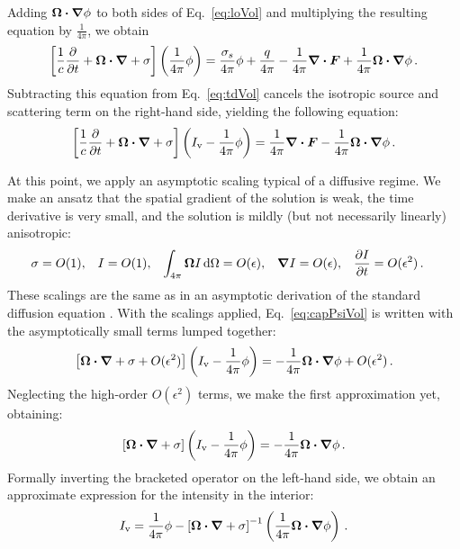 Adding $\bm{\Omega}\bm{\cdot} \bm{\nabla} \phi$ to both sides of Eq.~\eqref{eq:loVol} and
multiplying the resulting equation by $\frac{1}{4\pi}$, we obtain
\begin{align*}
  \left[ \frac{1}{c}\frac{\partial }{\partial t}
  + \bm{\Omega}\bm{\cdot} \bm{\nabla}
  + \sigma \right]
  \left( \frac{1}{4\pi} \phi \right)
  = \frac{\sigma_s}{4\pi}
  \phi + \frac{q}{4\pi} - \frac{1}{4\pi} \bm{\nabla} \bm{\cdot}\bm{F} 
  + \frac{1}{4\pi} \bm{\Omega}\bm{\cdot} \bm{\nabla} \phi\,.
\end{align*}
Subtracting this equation from Eq.~\eqref{eq:tdVol} cancels the isotropic source
and scattering term on the right-hand side, yielding the following equation:
\begin{equation}\label{eq:capPsiVol}
  \left[ \frac{1}{c}\frac{\partial }{\partial t}
  + \bm{\Omega}\bm{\cdot} \bm{\nabla}
  + \sigma \right]
   \left( I_\mathrm{v}
  - \frac{1}{4\pi} \phi \right)
  = \frac{1}{4\pi} \bm{\nabla} \bm{\cdot}\bm{F} -
  \frac{1}{4\pi} \bm{\Omega}\bm{\cdot} \bm{\nabla} \phi\,.
\end{equation}

At this point, we apply an asymptotic scaling typical of a diffusive regime.
We make an ansatz that the spatial gradient of the solution is weak, the time
derivative is very small, and the solution is mildly (but not necessarily
linearly) anisotropic:
\begin{align} \label{eq:ansatz}
  \sigma &= O(1), &
  I &= O(1), &
  \int_{4\pi} \bm{\Omega} I \mathop{}\!\mathrm{d}\Omega &= O(\epsilon), &
  \bm{\nabla} I &= O(\epsilon), &
  \frac{\partial I}{\partial t} &= O(\epsilon^2) \,.
\end{align}
These scalings are the same as in an asymptotic derivation of the standard
diffusion equation \cite{Lar1975,Mor2000}. With the scalings applied,
Eq.~\eqref{eq:capPsiVol} is written with the asymptotically small terms lumped
together:
\begin{equation*}
  \left[\bm{\Omega}\bm{\cdot} \bm{\nabla}
  + \sigma + O(\epsilon^2) \right]
   \left( I_\mathrm{v}
  - \frac{1}{4\pi} \phi \right)
  = - \frac{1}{4\pi} \bm{\Omega}\bm{\cdot} \bm{\nabla} \phi + O(\epsilon^2)\,.
\end{equation*}
Neglecting the high-order $O(\epsilon^2)$ terms, we make the first approximation
yet, obtaining:
\begin{equation}\label{eq:tdVolApprox1}
  \left[\bm{\Omega}\bm{\cdot} \bm{\nabla}  + \sigma \right]
   \left( I_\mathrm{v}
  - \frac{1}{4\pi} \phi \right)
  = - \frac{1}{4\pi} \bm{\Omega}\bm{\cdot} \bm{\nabla} \phi \,.
\end{equation}
Formally inverting the bracketed operator on the left-hand side, we obtain an
approximate expression for the intensity in the interior:
\begin{equation}\label{eq:tdVolApprox2}
  I_\mathrm{v} = \frac{1}{4\pi} \phi - 
  \left[\bm{\Omega}\bm{\cdot} \bm{\nabla}  + \sigma \right]^{-1}
  \left( \frac{1}{4\pi} \bm{\Omega}\bm{\cdot} \bm{\nabla} \phi \right)\,.
\end{equation}

